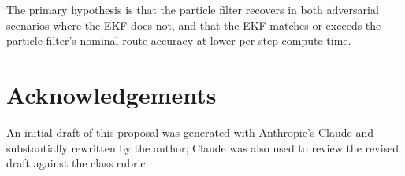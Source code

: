 \documentclass[11pt]{article}
\begin{document}
The primary hypothesis is that the particle filter recovers in both adversarial scenarios where the EKF does not, and that the EKF matches or exceeds the particle filter's nominal-route accuracy at lower per-step compute time.

\newpage
\section{Acknowledgements}

An initial draft of this proposal was generated with Anthropic's Claude and substantially rewritten by the author; Claude was also used to review the revised draft against the class rubric.


\end{document}

